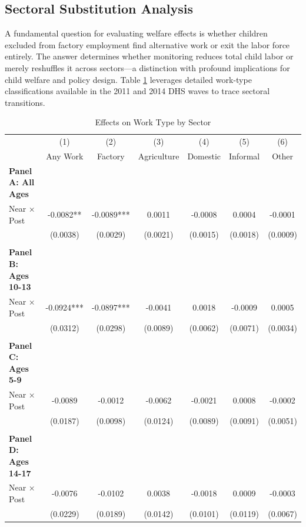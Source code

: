 \documentclass[12pt]{article}
\begin{document}
\subsection{Sectoral Substitution Analysis}

A fundamental question for evaluating welfare effects is whether children excluded from factory employment find alternative work or exit the labor force entirely. The answer determines whether monitoring reduces total child labor or merely reshuffles it across sectors—a distinction with profound implications for child welfare and policy design. Table \ref{tab:substitution} leverages detailed work-type classifications available in the 2011 and 2014 DHS waves to trace sectoral transitions.

\begin{table}[H]
\centering
\caption{Effects on Work Type by Sector}
\label{tab:substitution}
\begin{threeparttable}
\begin{tabular}{lcccccc}
\toprule
& (1) & (2) & (3) & (4) & (5) & (6) \\
& Any Work & Factory & Agriculture & Domestic & Informal & Other \\
\midrule
\textbf{Panel A: All Ages} & & & & & & \\
Near × Post & -0.0082** & -0.0089*** & 0.0011 & -0.0008 & 0.0004 & -0.0001 \\
& (0.0038) & (0.0029) & (0.0021) & (0.0015) & (0.0018) & (0.0009) \\
& & & & & & \\
\textbf{Panel B: Ages 10-13} & & & & & & \\
Near × Post & -0.0924*** & -0.0897*** & -0.0041 & 0.0018 & -0.0009 & 0.0005 \\
& (0.0312) & (0.0298) & (0.0089) & (0.0062) & (0.0071) & (0.0034) \\
& & & & & & \\
\textbf{Panel C: Ages 5-9} & & & & & & \\
Near × Post & -0.0089 & -0.0012 & -0.0062 & -0.0021 & 0.0008 & -0.0002 \\
& (0.0187) & (0.0098) & (0.0124) & (0.0089) & (0.0091) & (0.0051) \\
& & & & & & \\
\textbf{Panel D: Ages 14-17} & & & & & & \\
Near × Post & -0.0076 & -0.0102 & 0.0038 & -0.0018 & 0.0009 & -0.0003 \\
& (0.0229) & (0.0189) & (0.0142) & (0.0101) & (0.0119) & (0.0067) \\

\end{tabular}
\end{threeparttable}
\end{table}
\end{document}
